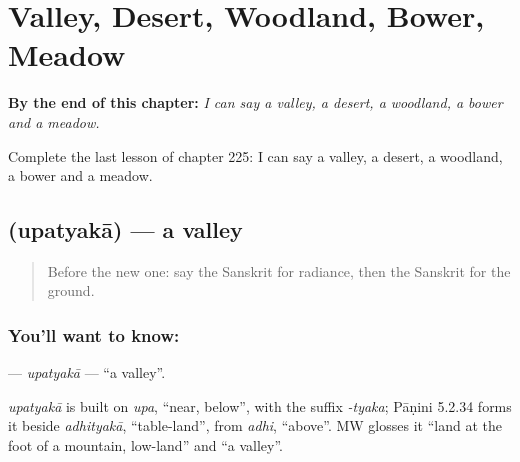 
\chapter{Valley, Desert, Woodland, Bower, Meadow}
\label{ch:sa-valley-desert-woodland-bower-meadow}

\begin{chapteropening}
\textbf{By the end of this chapter:} \emph{I can say a valley, a desert, a woodland, a bower and a meadow.}

Complete the last lesson of chapter 225: I can say a valley, a desert, a woodland, a bower and a meadow.
\end{chapteropening}

\section[\texorpdfstring{\sk{उपत्यका} (upatyakā)}{उपत्यका (upatyakā)}]{ (upatyakā) — a valley}

\label{lesson:SA-C225-upatyaka}



\begin{quote}
Before the new one: say the Sanskrit for radiance, then the Sanskrit for the ground.
\end{quote}

\subsection*{You'll want to know: }
\textbf{} — \emph{upatyakā} — \textquotedblleft{}a valley\textquotedblright{}.

\begin{cousinweb}
\emph{upatyakā} is built on \emph{upa}, \textquotedblleft{}near, below\textquotedblright{}, with the suffix \emph{-tyaka}; Pāṇini 5.2.34 forms it beside \emph{adhityakā}, \textquotedblleft{}table-land\textquotedblright{}, from \emph{adhi}, \textquotedblleft{}above\textquotedblright{}. MW glosses it \textquotedblleft{}land at the foot of a mountain, low-land\textquotedblright{} and \textquotedblleft{}a valley\textquotedblright{}.
\end{cousinweb}

